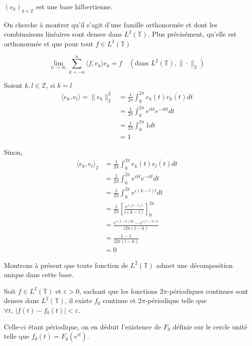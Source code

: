 			\begin{myproposition}
				$ (e_k)_{k\in\mathbb{Z}} $ est une base hilbertienne.
			\end{myproposition}
			
			\begin{myproof}	
				On cherche à montrer qu'il s'agit d'une famille orthonormée et dont les combinaisons linéaires sont denses dans $L^2 (\mathbb{T})$. Plus précisément, qu'elle est orthonormée et que pour tout $f \in L^2(\mathbb{T})$
				
				$$\lim\limits_{n \to \infty} \sum_{k = -n}^n \langle f, e_k \rangle e_k = f \quad (\text{dans } L^2(\mathbb{T}), \|\cdot\|_2)$$
				
				Soient $k, l \in \mathbb{Z}$, si $k=l$
				\begin{align*}
					\langle e_k, e_l \rangle = \|e_k\|_2^2 &= \frac{1}{2\pi}\int_0^{2\pi} e_k(t)\overline{e_k(t)}dt\\
					&  =  \frac{1}{2\pi}\int_0^{2\pi} e^{ikt}e^{-ikt}dt\\
					& = \frac{1}{2\pi} \int_0^{2\pi} 1 dt\\
					& = 1
				\end{align*}
				 
			
				Sinon, 
				\begin{align*}
				\langle e_k, e_l\rangle_2 & = \frac{1}{2\pi} \int_0^{2\pi} e_k(t) \overline{e_l(t)}dt 
				\\ & = \frac{1}{2\pi} \int_0^{2\pi}e^{ik t} e^{-il t} dt 
				\\ & = \frac{1}{{2\pi}} \int_0^{2\pi} e^{i(k-l)t} dt 
				\\ & = \frac{1}{{2\pi}}  \left[ \frac {e^{i(k-l) t}} {{i(k-l)}} \right] _0^{2\pi}
				\\ & = \frac {e^{i (l-k){2\pi}} - e^{i(l-k)  0}} {i {2\pi}(l-k)}
				\\ & = \frac {1 - 1}{i {2\pi}(l-k)}\\
				&= 0
				\end{align*}

				Montrons à présent que toute fonction de $L^2(\mathbb{T}) $ admet une décomposition unique dans cette base.
				
				Soit $f \in L^2(\mathbb{T})$ et $\varepsilon > 0$, sachant que les fonctions $2\pi$-périodiques continues sont denses dans $L^2(\mathbb{T})$, il existe $f_0$ continue et $2\pi$-périodique telle que $\forall t, ~ | f(t) - f_0(t)| < \varepsilon$. 
				
				Celle-ci étant périodique, on en déduit l'existence de $F_0$ définie sur le cercle unité telle que $f_0(t) = F_0(e^{it})$.
				

\end{myproof}
